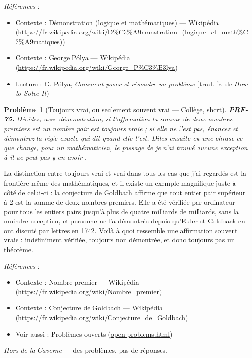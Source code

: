 \documentclass[11pt]{article}
\newtheorem{problem}{Problème}
\newenvironment{refs}{\par\small\noindent\emph{Références :}\begin{itemize}\setlength\itemsep{0pt}}{\end{itemize}\normalsize}
\begin{document}
\begin{refs}
\item Contexte : Démonstration (logique et mathématiques) --- Wikipédia (\url{https://fr.wikipedia.org/wiki/D%C3%A9monstration_(logique_et_math%C3%A9matiques)})
\item Contexte : George Pólya --- Wikipédia (\url{https://fr.wikipedia.org/wiki/George_P%C3%B3lya})
\item Lecture : G. Pólya, \textit{Comment poser et résoudre un problème} (trad. fr. de \textit{How to Solve It})
\end{refs}

\bigskip

\begin{problem}[{Toujours vrai, ou seulement souvent vrai --- Collège, short}]
\textbf{PRF-75.} Décidez, avec démonstration, si l'affirmation \og{} la
somme de deux nombres premiers est un nombre pair \fg{} est toujours vraie ; si elle ne l'est
pas, énoncez et démontrez la règle exacte qui dit quand elle l'est. Dites ensuite en une
phrase ce que change, pour un mathématicien, le passage de \og{} je n'ai trouvé aucune
exception \fg{} à \og{} il ne peut pas y en avoir \fg{}.
\end{problem}

\noindent La distinction entre \og{} toujours vrai \fg{} et \og{} vrai dans tous les cas que
j'ai regardés \fg{} est la frontière même des mathématiques, et il existe un exemple magnifique
juste à côté de celui-ci : la conjecture de Goldbach affirme que tout entier pair supérieur
à 2 est la somme de deux nombres premiers. Elle a été vérifiée par ordinateur pour tous les
entiers pairs jusqu'à plus de quatre milliards de milliards, sans la moindre exception, et
personne ne l'a démontrée depuis qu'Euler et Goldbach en ont discuté par lettres en 1742.
Voilà à quoi ressemble une affirmation \og{} souvent vraie \fg{} : indéfiniment vérifiée, toujours
non démontrée, et donc toujours pas un théorème.

\begin{refs}
\item Contexte : Nombre premier --- Wikipédia (\url{https://fr.wikipedia.org/wiki/Nombre_premier})
\item Contexte : Conjecture de Goldbach --- Wikipédia (\url{https://fr.wikipedia.org/wiki/Conjecture_de_Goldbach})
\item Voir aussi : Problèmes ouverts (\url{open-problems.html})
\end{refs}

\bigskip


\vfill
\noindent\emph{Hors de la Caverne} --- des probl\`emes, pas de r\'eponses.
\end{document}

